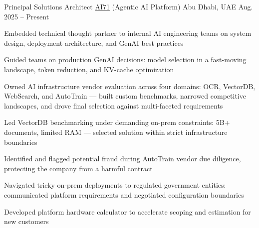 

\begin{cventries}

  \cventry
    {Principal Solutions Architect} %
    {\href{https://ai71.ai/}{AI71} (Agentic AI Platform)} %
    {Abu Dhabi, UAE} %
    {Aug. 2025 -- Present} %
    {
      \begin{cvitems} %
        \item {Embedded technical thought partner to internal AI engineering teams on system design, deployment architecture, and GenAI best practices}
        \item {Guided teams on production GenAI decisions: model selection in a fast-moving landscape, token reduction, and KV-cache optimization}
      \end{cvitems}
      \vspace{2mm}
      \begin{cvsubentries}
      \end{cvsubentries}
      \vspace{4mm}
      \begin{cvitems}
        \item {Owned AI infrastructure vendor evaluation across four domains: OCR, VectorDB, WebSearch, and AutoTrain --- built custom benchmarks, narrowed competitive landscapes, and drove final selection against multi-faceted requirements}
        \item {Led VectorDB benchmarking under demanding on-prem constraints: 5B+ documents, limited RAM --- selected solution within strict infrastructure boundaries}
        \item {Identified and flagged potential fraud during AutoTrain vendor due diligence, protecting the company from a harmful contract}
      \end{cvitems}
      \vspace{2mm}
      \begin{cvsubentries}
      \end{cvsubentries}
      \vspace{4mm}
      \begin{cvitems}
        \item {Navigated tricky on-prem deployments to regulated government entities: communicated platform requirements and negotiated configuration boundaries}
        \item {Developed platform hardware calculator to accelerate scoping and estimation for new customers}
      \end{cvitems}
    }


\end{cventries}
